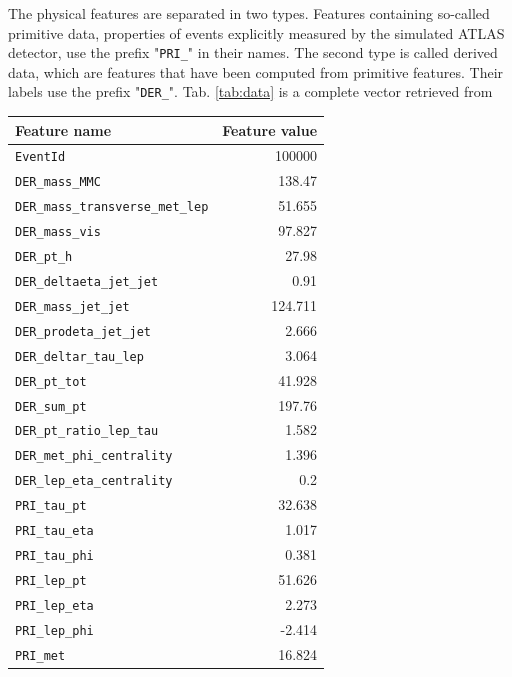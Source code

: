 The physical features are separated in two types. Features containing so-called primitive data, properties of events explicitly measured by the simulated ATLAS detector, use the prefix "\texttt{PRI\_}" in their names. The second type is called derived data, which are features that have been computed from primitive features. Their labels use the prefix "\texttt{DER\_}". Tab. \ref{tab:data} is a complete vector retrieved from \cite{higgsData}

\begin{table}
\begin{center}
	\begin{tabular}{|l|r|}
		\hline
		Feature name & Feature value \\
		\hline
		\texttt{EventId} & 100000 \\
		\hline
		\texttt{DER\_mass\_MMC} & 138.47 \\
		\hline
		\texttt{DER\_mass\_transverse\_met\_lep} & 51.655 \\
		\hline
		\texttt{DER\_mass\_vis} & 97.827 \\
		\hline
		\texttt{DER\_pt\_h} & 27.98 \\
		\hline
		\texttt{DER\_deltaeta\_jet\_jet} & 0.91 \\
		\hline
		\texttt{DER\_mass\_jet\_jet} & 124.711 \\
		\hline
		\texttt{DER\_prodeta\_jet\_jet} & 2.666 \\
		\hline
		\texttt{DER\_deltar\_tau\_lep} & 3.064 \\
		\hline
		\texttt{DER\_pt\_tot} & 41.928 \\
		\hline
		\texttt{DER\_sum\_pt} & 197.76 \\
		\hline
		\texttt{DER\_pt\_ratio\_lep\_tau} & 1.582 \\
		\hline
		\texttt{DER\_met\_phi\_centrality} & 1.396 \\
		\hline
		\texttt{DER\_lep\_eta\_centrality} & 0.2 \\
		\hline
		\texttt{PRI\_tau\_pt} & 32.638 \\
		\hline
		\texttt{PRI\_tau\_eta} & 1.017 \\
		\hline
		\texttt{PRI\_tau\_phi} & 0.381 \\
		\hline
		\texttt{PRI\_lep\_pt} & 51.626 \\
		\hline
		\texttt{PRI\_lep\_eta} & 2.273 \\
		\hline
		\texttt{PRI\_lep\_phi} & -2.414 \\
		\hline
		\texttt{PRI\_met} & 16.824 \\

\end{tabular}
\end{center}
\end{table}
